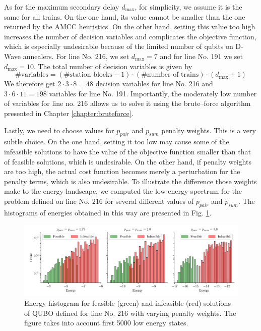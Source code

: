 As for the maximum secondary delay $d_{\max}$, for simplicity, we assume it is
the same for all trains. On the one hand, its value cannot be smaller than the
one returned by the AMCC heuristics. On the other hand, setting this value too
high increases the number of decision variables and complicates the objective
function, which is especially undesirable because of the limited number of
qubits on D-Wave annealers. For line No. 216, we set $d_{\max}=7$ and for line
No. 191 we set $d_{\max}=10$. The total number of decision variables is given
by
\begin{equation}
  \mbox{\#variables} = (\mbox{\#station blocks}-1) \cdot (\mbox{\#number of trains}) \cdot (d_{\max}+1)
\end{equation}
We therefore get $2\cdot 3 \cdot 8 = 48$ decision variables for line No. 216
and $3 \cdot 6 \cdot 11 = 198$ variables for line No. 191. Importantly, the
moderately low number of variables for line no. 216 allows us to solve it using
the brute--force algorithm presented in Chapter \ref{chapter:bruteforce}.

Lastly, we need to choose values for $p_{pair}$ and $p_{sum}$ penalty weights.
This is a very subtle choice. On the one hand, setting it too low may cause
some of the infeasible solutions to have the value of the objective function
smaller than that of feasible solutions, which is undesirable. On the other
hand, if penalty weights are too high, the actual cost function becomes merely
a perturbation for the penalty terms, which is also undesirable. To illustrate
the difference those weights make to the energy landscape, we computed the
low-energy spectrum for the problem defined on line No. 216 for several
different values of $p_{pair}$ and $p_{sum}$. The histograms of energies
obtained in this way are presented in Fig. \ref{fig:penaltyhistogram}.

\begin{figure}
  \includegraphics[width=\textwidth]{figures/railway_histograms_bf}
  \caption{Energy histogram for feasible (green) and infeasible (red) solutions of QUBO
    defined for line No. 216 with varying penalty weights. The figure takes into
    account first 5000 low energy states.} \label{fig:penaltyhistogram}
\end{figure}

